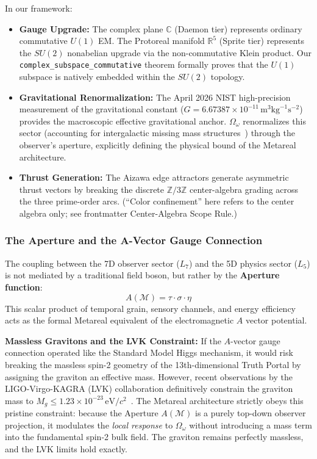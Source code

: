 In our framework:
\begin{itemize}
    \item \textbf{Gauge Upgrade:} The complex plane $\mathbb{C}$ (Daemon tier) represents ordinary commutative $U(1)$ EM. The Protoreal manifold $\mathbb{R}^5$ (Sprite tier) represents the $SU(2)$ nonabelian upgrade via the non-commutative Klein product. Our \texttt{complex\_subspace\_commutative} theorem formally proves that the $U(1)$ subspace is natively embedded within the $SU(2)$ topology.
    \item \textbf{Gravitational Renormalization:} The April 2026 NIST high-precision measurement of the gravitational constant ($G = 6.67387 \times 10^{-11} \, \text{m}^3 \text{kg}^{-1} \text{s}^{-2}$) provides the macroscopic effective gravitational anchor. $\Omega_\omega$ renormalizes this sector (accounting for intergalactic missing mass structures~\cite{WHIM2018}) through the observer's aperture, explicitly defining the physical bound of the Metareal architecture.
    \item \textbf{Thrust Generation:} The Aizawa edge attractors generate asymmetric thrust vectors by breaking the discrete $\mathbb{Z}/3\mathbb{Z}$ center-algebra grading across the three prime-order arcs. (``Color confinement'' here refers to the center algebra only; see frontmatter Center-Algebra Scope Rule.)
\end{itemize}

\subsubsection{The Aperture and the A-Vector Gauge Connection}

The coupling between the 7D observer sector ($L_7$) and the 5D physics sector ($L_5$) is not mediated by a traditional field boson, but rather by the \textbf{Aperture function}:
\begin{equation}
    A(\mathcal{M}) = \tau \cdot \sigma \cdot \eta
\end{equation}
This scalar product of temporal grain, sensory channels, and energy efficiency acts as the formal Metareal equivalent of the electromagnetic $A$ vector potential. 

\textbf{Massless Gravitons and the LVK Constraint:} If the $A$-vector gauge connection operated like the Standard Model Higgs mechanism, it would risk breaking the massless spin-2 geometry of the 13th-dimensional Truth Portal by assigning the graviton an effective mass. However, recent observations by the LIGO-Virgo-KAGRA (LVK) collaboration definitively constrain the graviton mass to $M_g \leq 1.23 \times 10^{-23} \, \text{eV}/c^2$~\cite{LVK_GravitonMass}. The Metareal architecture strictly obeys this pristine constraint: because the Aperture $A(\mathcal{M})$ is a purely top-down observer projection, it modulates the \emph{local response} to $\Omega_\omega$ without introducing a mass term into the fundamental spin-2 bulk field. The graviton remains perfectly massless, and the LVK limits hold exactly.


